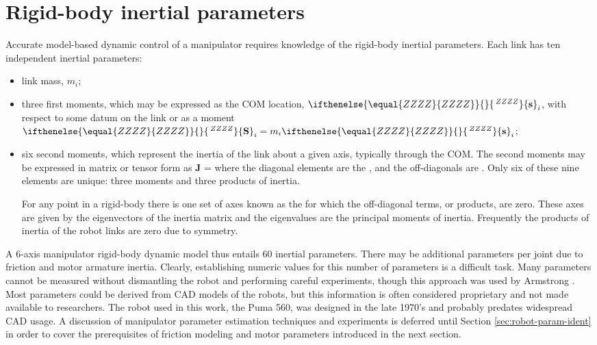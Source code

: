 \documentclass{article}
\renewcommand{\vec}[2][ZZZZ]{\ifthenelse{\equal{#1}{ZZZZ}}{}{\,{}^{#1}}{\bf #2}}
\begin{document}
\section{Rigid-body inertial parameters} \label{sec:robot-rigidbody-params}
Accurate model-based dynamic control of a manipulator requires knowledge of the
rigid-body inertial parameters.
Each link has ten independent  inertial parameters:
\begin{itemize}
\item link mass, $m_i$;
\item three first moments, which may be expressed
as the COM location, $\vec{s}_i$, with respect to some datum on the link
or as a moment $\vec{S}_i = m_i \vec{s}_i$;
\item six second moments, which represent the inertia of the link about a
given axis, typically through the COM.
The second moments may be expressed in matrix or tensor form as
\be
{\bf J} = 		\label{eq:inertia-matrix}
\ee
where the diagonal elements are the , and the
off-diagonals are .
Only six of these nine elements are unique:
three moments and three products of inertia.

For any point in a rigid-body there is one set of axes known as the
 for which the off-diagonal terms, or products, are
zero.  These axes are given by the eigenvectors of the
inertia matrix  and the eigenvalues are the principal moments of
inertia.  Frequently the products of inertia of the robot links are zero due 
to symmetry.
\end{itemize}

A 6-axis manipulator rigid-body dynamic model thus entails 60 
inertial parameters.
There may be additional parameters per joint due to friction and motor 
armature inertia.  
Clearly, establishing numeric values for this number of parameters is a difficult task.
Many parameters cannot be measured without dismantling the robot and performing
careful experiments, though this approach was used by Armstrong \etal\cite{Armstrong86}.
Most parameters could be derived from CAD models of the robots, but this information
is often considered proprietary and not made available to researchers.
The robot used in this work, the Puma 560, was designed in the late 1970's and 
probably predates widespread CAD usage.
A discussion of manipulator parameter estimation techniques and experiments
is deferred until Section \ref{sec:robot-param-ident} in order to cover the
prerequisites of friction modeling and motor parameters introduced in the
next section.
\end{document}
